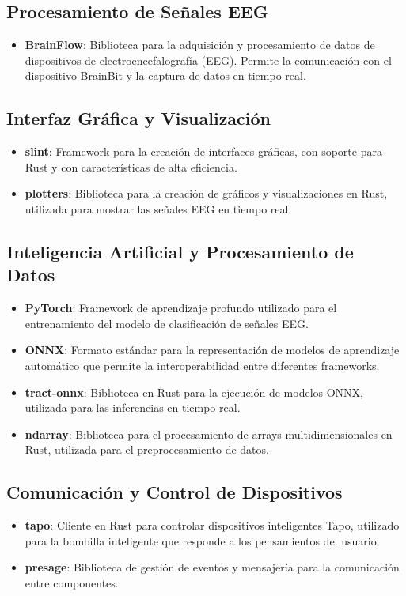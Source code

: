 \subsection{Procesamiento de Señales EEG}
\begin{itemize}
    \item \textbf{BrainFlow}: Biblioteca para la adquisición y procesamiento de datos de dispositivos de electroencefalografía (EEG). Permite la comunicación con el dispositivo BrainBit y la captura de datos en tiempo real.
\end{itemize}

\subsection{Interfaz Gráfica y Visualización}
\begin{itemize}
    \item \textbf{slint}: Framework para la creación de interfaces gráficas, con soporte para Rust y con características de alta eficiencia.
    \item \textbf{plotters}: Biblioteca para la creación de gráficos y visualizaciones en Rust, utilizada para mostrar las señales EEG en tiempo real.
\end{itemize}

\subsection{Inteligencia Artificial y Procesamiento de Datos}
\begin{itemize}
    \item \textbf{PyTorch}: Framework de aprendizaje profundo utilizado para el entrenamiento del modelo de clasificación de señales EEG.
    \item \textbf{ONNX}: Formato estándar para la representación de modelos de aprendizaje automático que permite la interoperabilidad entre diferentes frameworks.
    \item \textbf{tract-onnx}: Biblioteca en Rust para la ejecución de modelos ONNX, utilizada para las inferencias en tiempo real.
    \item \textbf{ndarray}: Biblioteca para el procesamiento de arrays multidimensionales en Rust, utilizada para el preprocesamiento de datos.
\end{itemize}

\subsection{Comunicación y Control de Dispositivos}
\begin{itemize}
    \item \textbf{tapo}: Cliente en Rust para controlar dispositivos inteligentes Tapo, utilizado para la bombilla inteligente que responde a los pensamientos del usuario.
    \item \textbf{presage}: Biblioteca de gestión de eventos y mensajería para la comunicación entre componentes.
\end{itemize}

